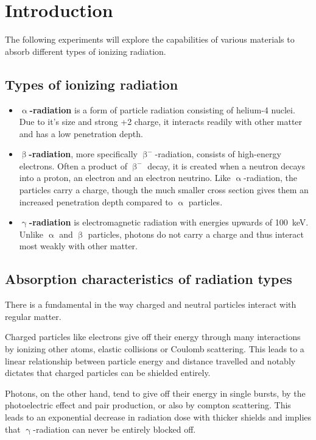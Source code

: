 \chapter{Introduction}

The following experiments will explore the capabilities of various materials to absorb different types of ionizing radiation.

\section{Types of ionizing radiation}
\begin{itemize}
	\item \textbf{$\upalpha$-radiation} is a form of particle radiation consisting of helium-4 nuclei.
	Due to it's size and strong +2 charge, it interacts readily with other matter and has a low penetration depth.
	\item \textbf{$\upbeta$-radiation}, more specifically $\upbeta^{-}$-radiation, consists of high-energy electrons.
	Often a product of $\upbeta^{-}$ decay, it is created when a neutron decays into a proton, an electron and an electron neutrino.
	Like $\upalpha$-radiation, the particles carry a charge, though the much smaller cross section gives them an increased penetration depth compared to $\upalpha$ particles.
	\item \textbf{$\upgamma$-radiation} is electromagnetic radiation with energies upwards of \SI{100}{\kilo\electronvolt}.
	Unlike $\upalpha$ and $\upbeta$ particles, photons do not carry a charge and thus interact most weakly with other matter.
\end{itemize}

\section{Absorption characteristics of radiation types}
There is a fundamental in the way charged and neutral particles interact with regular matter.

Charged particles like electrons give off their energy through many interactions by ionizing other atoms, elastic collisions or Coulomb scattering.
This leads to a linear relationship between particle energy and distance travelled and notably dictates that charged particles can be shielded entirely.

Photons, on the other hand, tend to give off their energy in single bursts, by the photoelectric effect and pair production, or also by compton scattering.
This leads to an exponential decrease in radiation dose with thicker shields and implies that $\upgamma$-radiation can never be entirely blocked off.

